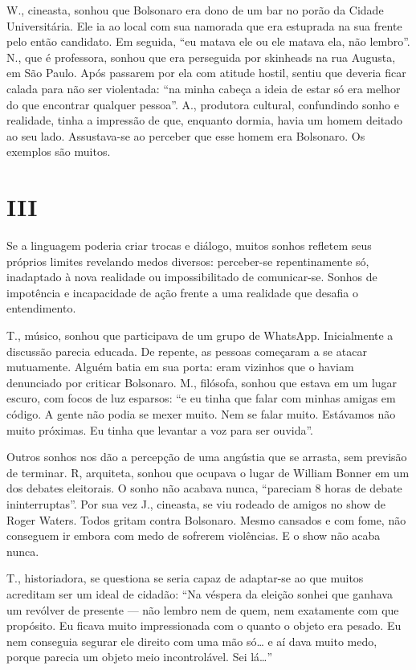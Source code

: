 W., cineasta, sonhou que Bolsonaro era dono de um bar no porão da Cidade
Universitária. Ele ia ao local com sua namorada que era estuprada na sua
frente pelo então candidato. Em seguida, ``eu matava ele ou ele matava
ela, não lembro''. N., que é professora, sonhou que era perseguida por
skinheads na rua Augusta, em São Paulo. Após passarem por ela com
atitude hostil, sentiu que deveria ficar calada para não ser violentada:
``na minha cabeça a ideia de estar só era melhor do que encontrar
qualquer pessoa''. A., produtora cultural, confundindo sonho e
realidade, tinha a impressão de que, enquanto dormia, havia um homem
deitado ao seu lado. Assustava-se ao perceber que esse homem era
Bolsonaro. Os exemplos são muitos.

\section*{III}

Se a linguagem poderia criar trocas e diálogo, muitos sonhos refletem
seus próprios limites revelando medos diversos: perceber-se
repentinamente só, inadaptado à nova realidade ou impossibilitado de
comunicar-se. Sonhos de impotência e incapacidade de ação frente a uma
realidade que desafia o entendimento.

T., músico, sonhou que participava de um grupo de WhatsApp. Inicialmente
a discussão parecia educada. De repente, as pessoas começaram a se
atacar mutuamente. Alguém batia em sua porta: eram vizinhos que o haviam
denunciado por criticar Bolsonaro. M., filósofa, sonhou que estava em um
lugar escuro, com focos de luz esparsos: ``e eu tinha que falar com
minhas amigas em código. A gente não podia se mexer muito. Nem se falar
muito. Estávamos não muito próximas. Eu tinha que levantar a voz para
ser ouvida''.

Outros sonhos nos dão a percepção de uma angústia que se arrasta, sem
previsão de terminar. R, arquiteta, sonhou que ocupava o lugar de William
Bonner em um dos debates eleitorais. O sonho não acabava nunca,
``pareciam 8 horas de debate ininterruptas''. Por sua vez J., cineasta,
se viu rodeado de amigos no show de Roger Waters. Todos gritam contra
Bolsonaro. Mesmo cansados e com fome, não conseguem ir embora com medo
de sofrerem violências. E o show não acaba nunca.

T., historiadora, se questiona se seria capaz de adaptar-se ao que
muitos acreditam ser um ideal de cidadão: ``Na véspera da eleição sonhei
que ganhava um revólver de presente --- não lembro nem de quem, nem
exatamente com que propósito. Eu ficava muito impressionada com o
quanto o objeto era pesado. Eu nem conseguia segurar ele direito com uma
mão só\ldots{} e aí dava muito medo, porque parecia um objeto meio
incontrolável. Sei lá\ldots{}''


